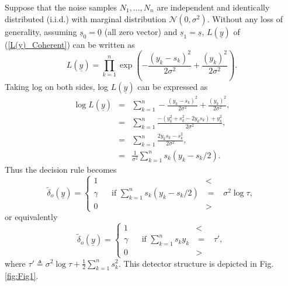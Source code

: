 \documentclass[a4paper,english,12pt]{article}
\begin{document}
\begin{exmp}
\label{caseI}
Suppose that the noise samples $N_{1},...,N_{n}$ are independent and identically distributed (i.i.d.) with marginal distribution $\mathcal{N}(0,\sigma^2)$. Without any loss of generality, assuming $\underline{s}_{0}= \underline{0}$ (all zero vector) and $\underline{s}_{1}= \underline{s}$, $L(\underline{y})$ of (\ref{L(y)_Coherent}) can be written as
\begin{equation}
L(\underline{y})=\prod_{k=1}^{n}\exp\left(-\frac{(y_{k}-s_{k})^2}{2\sigma^2}+\frac{(y_{k})^2}{2\sigma^2}\right).
\end{equation}
Taking log on both sides, log $L(\underline{y})$ can be expressed as
\begin{eqnarray}
\log L(\underline{y})
  &=& \sum_{k=1}^{n}-\frac{(y_{k}-s_{k})^2}{2\sigma^2}+\frac{(y_{k})^2}{2\sigma^2}, \nonumber\\
  &=& \sum_{k=1}^{n}\frac{-(y_{k}^2+s_{k}^2-2y_{k}s_{k})+y_{k}^2}{2\sigma^2}, \nonumber\\
  &=& \sum_{k=1}^{n}\frac{2 y_{k} s_{k}-s_{k}^2 }{2\sigma^2}, \nonumber\\
  &=& \frac {1}{\sigma^2}\sum_{k=1}^{n}s_{k}(y_{k}-s_{k}/2). 
\end{eqnarray}
Thus the decision rule becomes
\begin{equation}
{\tilde\delta_{o}(\underline{y})}= \begin{cases} 
1 &<\\
\gamma \hspace{20pt}\text{if }\sum_{k=1}^{n}s_{k}(y_{k}-s_{k}/2)&=\hspace{10pt}\sigma^2\log\tau,\\
0 &>
\end{cases}
\end{equation}
or equivalently
\begin{equation}
{\tilde\delta_{o}(\underline{y})}= \begin{cases} 
1 &<\\
\gamma \hspace{20pt}\text{if }\sum_{k=1}^{n}s_{k}y_{k}&=\hspace{10pt}\tau',\\
0 &>
\end{cases}
\end{equation}
where $\tau'\triangleq\sigma^2\log\tau+\frac{1}{2}\sum_{k=1}^{n}s_{k}^2$. This detector structure is depicted in Fig. \ref{fig:Fig1}.
\begin{figure}[h]

\end{figure}
\end{exmp}
\end{document}
